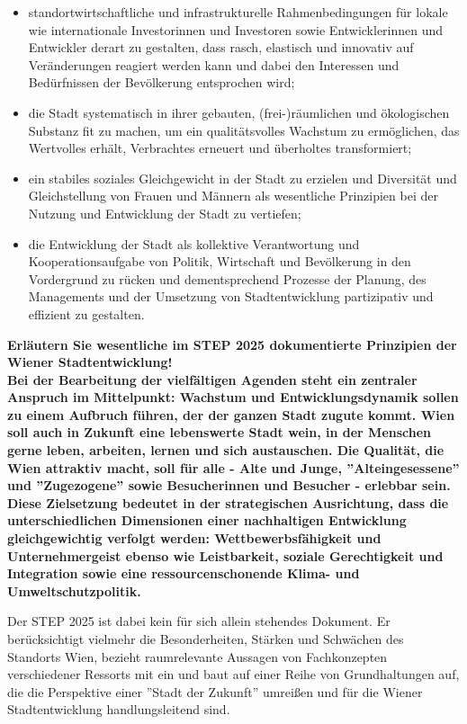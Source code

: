 \documentclass[]{article}
\newenvironment{question}{\vspace{8mm}\noindent\bfseries}{\\}
\begin{document}
\begin{itemize}
	\item standortwirtschaftliche und infrastrukturelle Rahmenbedingungen für lokale wie internationale Investorinnen und Investoren sowie Entwicklerinnen und Entwickler derart zu gestalten, dass rasch, elastisch und innovativ auf Veränderungen reagiert werden kann und dabei den Interessen und Bedürfnissen der Bevölkerung entsprochen wird;
	\item die Stadt systematisch in ihrer gebauten, (frei-)räumlichen und ökologischen Substanz fit zu machen, um ein qualitätsvolles Wachstum zu ermöglichen, das Wertvolles erhält, Verbrachtes erneuert und überholtes transformiert;
	\item ein stabiles soziales Gleichgewicht in der Stadt zu erzielen und Diversität und Gleichstellung von Frauen und Männern als wesentliche Prinzipien bei der Nutzung und Entwicklung der Stadt zu vertiefen;
	\item die Entwicklung der Stadt als kollektive Verantwortung und Kooperationsaufgabe von Politik, Wirtschaft und Bevölkerung in den Vordergrund zu rücken und dementsprechend Prozesse der Planung, des Managements und der Umsetzung von Stadtentwicklung partizipativ und effizient zu gestalten.
\end{itemize}

\begin{question}
	Erläutern Sie wesentliche im STEP 2025 dokumentierte Prinzipien der Wiener Stadtentwicklung!
\end{question}
Bei der Bearbeitung der vielfältigen Agenden steht ein zentraler Anspruch im Mittelpunkt: Wachstum und Entwicklungsdynamik sollen zu einem Aufbruch führen, der der ganzen Stadt zugute kommt. Wien soll auch in Zukunft eine lebenswerte Stadt wein, in der Menschen gerne leben, arbeiten, lernen und sich austauschen. Die Qualität, die Wien attraktiv macht, soll für alle - Alte und Junge, ''Alteingesessene'' und ''Zugezogene'' sowie Besucherinnen und Besucher - erlebbar sein. Diese Zielsetzung bedeutet in der strategischen Ausrichtung, dass die unterschiedlichen Dimensionen einer nachhaltigen Entwicklung gleichgewichtig verfolgt werden: Wettbewerbsfähigkeit und Unternehmergeist ebenso wie Leistbarkeit, soziale Gerechtigkeit und Integration sowie eine ressourcenschonende Klima- und Umweltschutzpolitik.

Der STEP 2025 ist dabei kein für sich allein stehendes Dokument. Er berücksichtigt vielmehr die Besonderheiten, Stärken und Schwächen des Standorts Wien, bezieht raumrelevante Aussagen von Fachkonzepten verschiedener Ressorts mit ein und baut auf einer Reihe von Grundhaltungen auf, die die Perspektive einer ''Stadt der Zukunft'' umreißen und für die Wiener Stadtentwicklung handlungsleitend sind.
\end{document}
